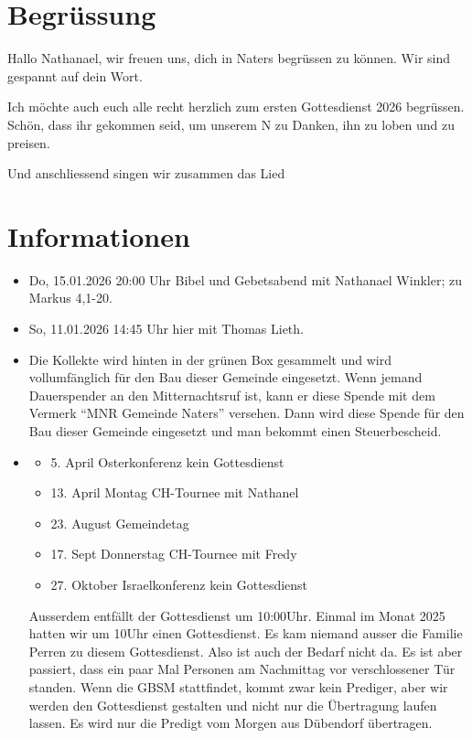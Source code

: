 \documentclass[fontsize=14pt]{mybib}
\newcommand{\Name}{Nathanael}
\begin{document}
\section{Begrüssung}
Hallo \Name{}, wir freuen uns, dich in Naters begrüssen zu können. Wir sind gespannt auf dein Wort.

Ich möchte auch euch alle recht herzlich zum ersten Gottesdienst 2026 begrüssen. Schön, dass ihr gekommen seid, um unserem \herr N zu Danken, ihn zu loben und zu preisen.

\beten{} Und anschliessend singen wir zusammen das Lied



\section{Informationen}
\begin{itemize}
    \item {} Do, 15.01.2026 20:00 Uhr Bibel und Gebetsabend mit Nathanael Winkler; zu Markus 4,1-20.
    \item {} So, 11.01.2026 14:45 Uhr hier mit Thomas Lieth. 
    \item {} Die Kollekte wird hinten in der grünen Box gesammelt und wird vollumfänglich für den Bau dieser Gemeinde eingesetzt.\newline
    Wenn jemand Dauerspender an den Mitternachtsruf ist, kann er diese Spende mit dem Vermerk \enquote{MNR Gemeinde Naters} versehen. Dann wird diese Spende für den Bau dieser Gemeinde eingesetzt und man bekommt einen Steuerbescheid.
    \item {}
    \begin{itemize}
        \item 5. April Osterkonferenz kein Gottesdienst
        \item 13. April Montag CH-Tournee mit Nathanel
        \item 23. August Gemeindetag
        \item 17. Sept Donnerstag CH-Tournee mit Fredy
        \item 27. Oktober Israelkonferenz kein Gottesdienst        
    \end{itemize}
    Ausserdem entfällt der Gottesdienst um 10:00Uhr. Einmal im Monat 2025 hatten wir um 10Uhr einen Gottesdienst. Es kam niemand ausser die Familie Perren zu diesem Gottesdienst. Also ist auch der Bedarf nicht da. Es ist aber passiert, dass ein paar Mal Personen am Nachmittag vor verschlossener Tür standen. Wenn die GBSM stattfindet, kommt zwar kein Prediger, aber wir werden den Gottesdienst gestalten und nicht nur die Übertragung laufen lassen. Es wird nur die Predigt vom Morgen aus Dübendorf übertragen.
\end{itemize}
\end{document}
